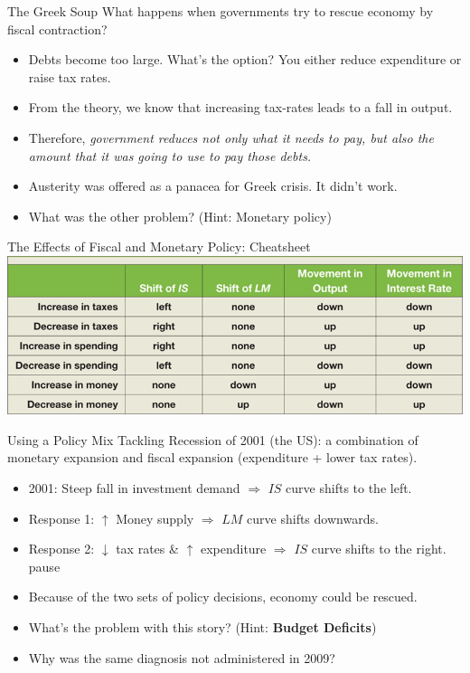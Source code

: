 \documentclass[shownotes,11pt, aspectratio=169]{beamer}
\begin{document}
\begin{frame}{The Greek Soup}
What happens when governments try to rescue economy by fiscal contraction?
\begin{itemize}
\item Debts become too large. What's the option? You either reduce expenditure or raise tax rates.
\pause
\item From the theory, we know that increasing tax-rates leads to a fall in output.
\item Therefore, \textit{government reduces not only what it needs to pay, but also the amount that it was going to use to pay those debts.}
\pause
\item Austerity was offered as a panacea for Greek crisis. It didn't work.
\pause
\item What was the other problem? \pause (Hint: Monetary policy)
\end{itemize}
\end{frame}

\begin{frame}{The Effects of Fiscal and Monetary Policy: Cheatsheet}
\includegraphics[scale=0.65]{graphs/L4F11.png}
\end{frame}

\begin{frame}{Using a Policy Mix}
Tackling Recession of 2001 (the US): a combination of monetary expansion and fiscal expansion (expenditure + lower tax rates).
\begin{itemize}
\item 2001: Steep fall in investment demand $\Rightarrow$ $IS$ curve shifts to the left. \pause
\item Response 1: $\uparrow$ Money supply $\Rightarrow$ $LM$ curve shifts downwards. \pause
\item Response 2: $\downarrow$ tax rates \& $\uparrow$ expenditure $\Rightarrow$ $IS$ curve shifts to the right.
pause
\item Because of the two sets of policy decisions, economy could be rescued. \pause
\item What's the problem with this story? \pause (Hint: \textbf{Budget Deficits})
\item Why was the same diagnosis not administered in 2009? 
\end{itemize}
\end{frame}
\end{document}

